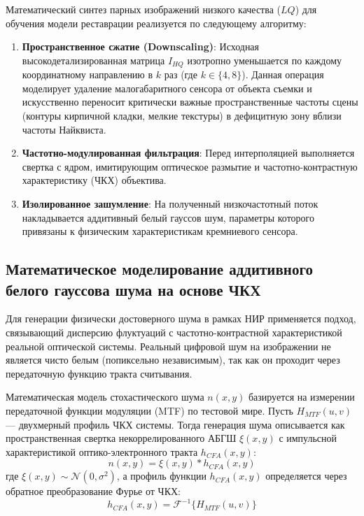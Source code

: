 \documentclass[12pt,a4paper]{article}
\begin{document}
Математический синтез парных изображений низкого качества ($LQ$) для обучения модели реставрации реализуется по следующему алгоритму:
\begin{enumerate}
    \item \textbf{Пространственное сжатие (Downscaling)}: Исходная высокодетализированная матрица $I_{HQ}$ изотропно уменьшается по каждому координатному направлению в $k$ раз (где $k \in \{4, 8\}$). Данная операция моделирует удаление малогабаритного сенсора от объекта съемки и искусственно переносит критически важные пространственные частоты сцены (контуры кирпичной кладки, мелкие текстуры) в дефицитную зону вблизи частоты Найквиста.
    \item \textbf{Частотно-модулированная фильтрация}: Перед интерполяцией выполняется свертка с ядром, имитирующим оптическое размытие и частотно-контрастную характеристику (ЧКХ) объектива.
    \item \textbf{Изолированное зашумление}: На полученный низкочастотный поток накладывается аддитивный белый гауссов шум, параметры которого привязаны к физическим характеристикам кремниевого сенсора.
\end{enumerate}

\subsection{Математическое моделирование аддитивного белого гауссова шума на основе ЧКХ}
Для генерации физически достоверного шума в рамках НИР применяется подход, связывающий дисперсию флуктуаций с частотно-контрастной характеристикой реальной оптической системы. Реальный цифровой шум на изображении не является чисто белым (попиксельно независимым), так как он проходит через передаточную функцию тракта считывания.

Математическая модель стохастического шума $n(x, y)$ базируется на измерении передаточной функции модуляции (MTF) по тестовой мире. Пусть $H_{MTF}(u, v)$ --- двухмерный профиль ЧКХ системы. Тогда генерация шума описывается как пространственная свертка некоррелированного АБГШ $\xi(x, y)$ с импульсной характеристикой оптико-электронного тракта $h_{CFA}(x, y)$:
\begin{equation}
    n(x, y) = \xi(x, y) * h_{CFA}(x, y)
\end{equation}
где $\xi(x, y) \sim \mathcal{N}(0, \sigma^2)$, а профиль функции $h_{CFA}(x, y)$ определяется через обратное преобразование Фурье от ЧКХ:
\begin{equation}
    h_{CFA}(x, y) = \mathcal{F}^{-1}\{H_{MTF}(u, v)\}
\end{equation}
\end{document}
